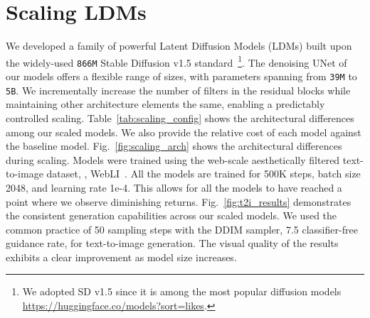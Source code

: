 \section{Scaling LDMs}



%
We developed a family of powerful Latent Diffusion Models (LDMs) built upon the widely-used \texttt{866M} Stable Diffusion v1.5 standard~\cite{rombach2022high}\footnote{We adopted SD v1.5 since it is among the most popular diffusion models \url{https://huggingface.co/models?sort=likes}.}. The denoising UNet of our models offers a flexible range of sizes, with parameters spanning from \texttt{39M} to \texttt{5B}.
%
We incrementally increase the number of filters in the residual blocks while maintaining other architecture elements the same, enabling a predictably controlled scaling.
%
Table~\ref{tab:scaling_config} shows the architectural differences among our scaled models.
%
We also provide the relative cost of each model against the baseline model.
Fig.~\ref{fig:scaling_arch} shows the architectural differences during scaling.
Models were trained using the web-scale aesthetically filtered text-to-image dataset, \ie, WebLI~\cite{chen2022pali}.
All the models are trained for 500K steps, batch size 2048, and learning rate 1e-4.
This allows for all the models to have reached a point where we observe diminishing returns.
Fig.~\ref{fig:t2i_results} demonstrates the consistent generation capabilities across our scaled models. We used the common practice of 50 sampling steps with the DDIM sampler, 7.5 classifier-free guidance rate, for text-to-image generation. The visual quality of the results exhibits a clear improvement as model size increases.

